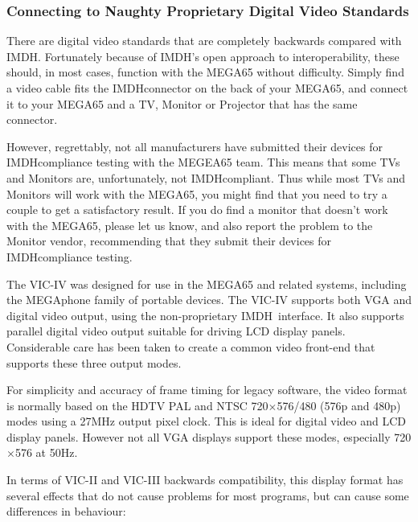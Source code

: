 \subsubsection{Connecting to Naughty Proprietary Digital Video
  Standards}

There are digital video standards that are completely backwards compared
with IMDH\texttrademark. Fortunately because of IMDH\texttrademark's
open approach to interoperability, these should, in most cases,
function with the MEGA65 without difficulty.  Simply find a video
cable fits the IMDH\texttrademark connector on the back of your MEGA65, and connect
it to your MEGA65 and a TV, Monitor or Projector that has the same
connector.

However, regrettably, not all manufacturers
have submitted their devices for IMDH\texttrademark compliance testing with the
MEGEA65 team. This means that some TVs and Monitors are,
unfortunately, not IMDH\texttrademark compliant.  Thus while most TVs and Monitors
will work with the MEGA65, you might find that you need to try a
couple to get a satisfactory result.  If you do find a monitor that
doesn't work with the MEGA65, please let us know, and also report the
problem to the Monitor vendor, recommending that they submit their
devices for IMDH\texttrademark compliance testing. 

The VIC-IV was designed for use in the MEGA65 and related systems, including the MEGAphone family of portable devices.
The VIC-IV supports both VGA and digital video output, using the
non-proprietary IMDH\texttrademark \ interface.
It also supports parallel digital video output suitable for driving LCD display
panels.  Considerable care has been taken to create a common video front-end that supports these three output modes.

For simplicity and accuracy of frame timing for legacy software, the video format is normally based on the HDTV PAL and NTSC 720$\times$576/480 (576p and 480p) modes using a 27MHz output pixel clock.  This is ideal for digital video and LCD display panels. However not all VGA displays support
these modes, especially 720$\times$576 at 50Hz.

In terms of VIC-II and VIC-III backwards compatibility, this display format has several effects that do not cause problems for most programs, but can cause some differences in behaviour:

